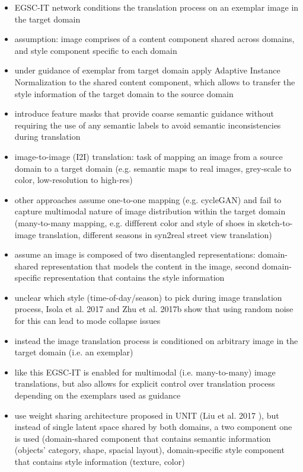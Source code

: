\begin{itemize}
	\item EGSC-IT network conditions the translation process on an exemplar image in the target domain
	\item assumption: image comprises of a content component shared across domains, and style component specific to each domain
	\item under guidance of exemplar from target domain apply Adaptive Instance Normalization to the shared content component, which allows to transfer the style information of the target domain to the source domain
	\item introduce feature masks that provide coarse semantic guidance without requiring the use of any semantic labels to avoid semantic inconsistencies during translation
	\item image-to-image (I2I) translation: task of mapping an image from a source domain to a target domain (e.g. semantic maps to real images, grey-scale to color, low-resolution to high-res)
	\item other approaches assume one-to-one mapping (e.g. cycleGAN) and fail to capture multimodal nature of image distribution within the target domain (many-to-many mapping, e.g. diffferent color and style of shoes in sketch-to-image translation, different seasons in syn2real street view translation)
	\item assume an image is composed of two disentangled representations: domain-shared representation that models the content in the image, second domain-specific representation that contains the style information
	\item unclear which style (time-of-day/season) to pick during image translation process, Isola et al. 2017 and Zhu et al. 2017b  show that using random noise for this can lead to mode collapse issues
	\item instead the image translation process is conditioned on arbitrary image in the target domain (i.e. an exemplar)
	\item like this EGSC-IT is enabled for multimodal (i.e. many-to-many) image translations, but also allows for explicit control over translation process depending on the exemplars used as guidance
	\item use weight sharing architecture proposed in UNIT (Liu et al. 2017 ), but instead of single latent space shared by both domains, a two component one is used (domain-shared component that contains semantic information (objects' category, shape, spacial layout), domain-specific style component that contains style information (texture, color)

\end{itemize}
